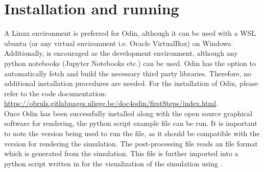 \section{Installation and running}
A Linux environment is preferred for Odin, although it can be used with a WSL ubuntu (or any virtual environment i.e. Oracle VirtualBox) on Windows. Additionally,  is encouraged as the development environment, although any python notebooks (Jupyter Notebooks etc.) can be used. Odin has the option to automatically fetch and build the necessary third party libraries. Therefore, no additional installation procedures are needed. For the installation of Odin, please refer to the code documentation: \url{https://obruls.gitlabpages.uliege.be/doc4odin/firstSteps/index.html}.\\

Once Odin has been successfully installed along with the open source graphical software  for rendering, the python script example file can be run. It is important to note the  version being used to run the file, as it should be compatible with the  version for rendering the simulation. The post-processing file reads an  file format which is generated from the simulation. This  file is further imported into a python script written in  for the visualization of the simulation using . 